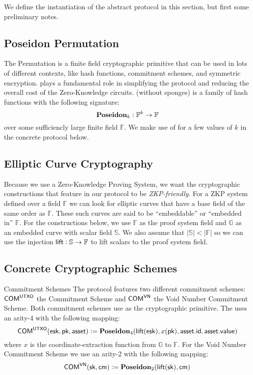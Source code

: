 
We define the instantiation of the abstract protocol in this section, but first some preliminary notes.

\subsection{Poseidon Permutation}

The \Poseidon{} Permutation \cite{KRRS21USENIX} is a finite field cryptographic primitive that can be used in lots of different contexts, like hash functions, commitment schemes, and symmetric encryption. \Poseidon{} plays a fundamental role in simplifying the protocol and reducing the overall cost of the Zero-Knowledge circuits. \Poseidon{} (without sponges) is a family of hash functions with the following signature:
\[{\textbf{Poseidon}}_k : \mathbb{F}^k \to \mathbb{F}\]
over some sufficiencly large finite field $\mathbb{F}$. We make use of \Poseidon{} for a few values of $k$ in the concrete protocol below.

\subsection{Elliptic Curve Cryptography}

Because we use a Zero-Knowledge Proving System, we want the cryptographic constructions that feature in our protocol to be \emph{ZKP-friendly}. For a ZKP system defined over a field $\mathbb{F}$ we can look for elliptic curves that have a base field of the same order as $\mathbb{F}$. These such curves are said to be ``embeddable'' or ``embedded in'' $\mathbb{F}$. For the constructions below, we use $\mathbb{F}$ as the proof system field and $\mathbb{G}$ as an embedded curve with scalar field $\mathbb{S}$. We also assume that $\left|\mathbb{S}\right| < \left|\mathbb{F}\right|$ so we can use the injection ${\textsf{lift}} : \mathbb{S} \to \mathbb{F}$ to lift scalars to the proof system field.

\subsection{Concrete Cryptographic Schemes}

\begin{definitiontoc}{Commitment Schemes}
    The protocol features two different commitment schemes: ${\textsf{COM}}^{{\textsf{UTXO}}}$ the \UTXO{} Commitment Scheme and ${\textsf{COM}}^{{\textsf{VN}}}$ the Void Number Commitment Scheme. Both commitment schemes use \Poseidon{} as the cryptographic primitive. The \UTXO{} uses an arity-4 \Poseidon{} with the following mapping:
    \[{\textsf{COM}}^{{\textsf{UTXO}}}({\textsf{esk}}, {\textsf{pk}}, {\textsf{asset}}) := {\textbf{Poseidon}}_4({\textsf{lift}}({\textsf{esk}}), x({\textsf{pk}}), {\textsf{asset}}.{\textsf{id}}, {\textsf{asset}}.{\textsf{value}})\]
    where $x$ is the coordinate-extraction function from $\mathbb{G}$ to $\mathbb{F}$.
    For the Void Number Commitment Scheme we use an arity-2 \Poseidon{} with the following mapping:
    \[{\textsf{COM}}^{{\textsf{VN}}}({\textsf{sk}}, {\textsf{cm}}) := {\textbf{Poseidon}}_2({\textsf{lift}}({\textsf{sk}}), {\textsf{cm}})\]
\end{definitiontoc}

